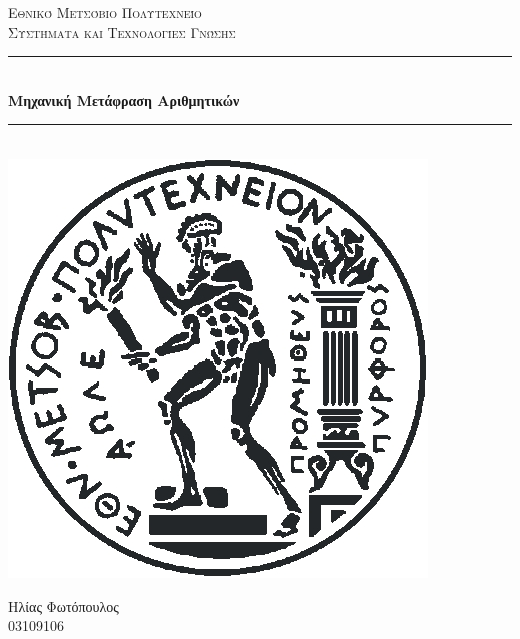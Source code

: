\documentclass[a4paper,12pt]{article}
\begin{document}
\begin{titlepage}

\newcommand{\HRule}{\rule{\linewidth}{0.5mm}} 

\center
 

\textsc{\LARGE Εθνικό Μετσόβιο Πολυτεχνείο}\\[1.5cm] %
\textsc{\Large Συστήματα και Τεχνολογίες Γνώσης}\\[0.5cm] %



\HRule \\[0.4cm]
{ \huge \bfseries Μηχανική Μετάφραση Αριθμητικών  }\\[0.4cm]
\HRule \\[1.5cm]
 

\includegraphics[scale=0.5]{ntua_logo} 
 
\vfill

Ηλίας Φωτόπουλος \\ 03109106\\


\end{titlepage}
\end{document}
